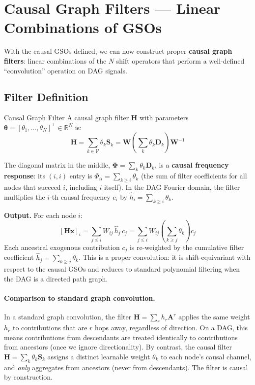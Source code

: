 \section{Causal Graph Filters --- Linear Combinations of GSOs}
\label{sec:dagcn_filters}

With the causal GSOs defined, we can now construct proper \textbf{causal graph
filters}: linear combinations of the $N$ shift operators that perform a
well-defined ``convolution'' operation on DAG signals.

\subsection{Filter Definition}

\begin{mathbox}{Causal Graph Filter}
A causal graph filter $\mathbf{H}$ with parameters $\boldsymbol{\theta} =
[\theta_1, \dots, \theta_N]^\top \in \mathbb{R}^N$ is:
\begin{equation}
    \mathbf{H} = \sum_{k \in \mathcal{V}} \theta_k \mathbf{S}_k
    = \mathbf{W} \left(\sum_k \theta_k \mathbf{D}_k\right) \mathbf{W}^{-1}
    \label{eq:causal_filter}
\end{equation}

The diagonal matrix in the middle, $\boldsymbol{\Phi} = \sum_k \theta_k
\mathbf{D}_k$, is a \textbf{causal frequency response}: its $(i,i)$ entry is
$\Phi_{ii} = \sum_{k \ge i} \theta_k$ (the sum of filter coefficients for all
nodes that succeed $i$, including $i$ itself). In the DAG Fourier domain, the
filter multiplies the $i$-th causal frequency $c_i$ by
$\hat{h}_i = \sum_{k \ge i} \theta_k$.

\medskip
\textbf{Output.} For each node $i$:
\[
    [\mathbf{H}\mathbf{x}]_i = \sum_{j \le i} W_{ij} \, \hat{h}_j \, c_j
    = \sum_{j \le i} W_{ij} \left(\sum_{k \ge j} \theta_k\right) c_j
\]
Each ancestral exogenous contribution $c_j$ is re-weighted by the cumulative
filter coefficient $\hat{h}_j = \sum_{k \ge j} \theta_k$. This is a proper
convolution: it is shift-equivariant with respect to the causal GSOs and
reduces to standard polynomial filtering when the DAG is a directed path graph.
\end{mathbox}

\paragraph{Comparison to standard graph convolution.}
In a standard graph convolution, the filter $\mathbf{H} = \sum_r h_r
\mathbf{A}^r$ applies the same weight $h_r$ to contributions that are $r$ hops
away, regardless of direction. On a DAG, this means contributions from
descendants are treated identically to contributions from ancestors (once we
ignore directionality). By contrast, the causal filter $\mathbf{H} =
\sum_k \theta_k \mathbf{S}_k$ assigns a distinct learnable weight
$\theta_k$ to each node's causal channel, and \emph{only} aggregates from
ancestors (never from descendants). The filter is causal by construction.

